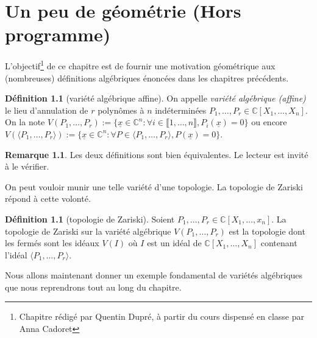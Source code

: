 \documentclass[a4paper, oneside, 12pt]{book}
\theoremstyle{theoremeStyle} %
\theoremstyle{definition} %
\newtheorem{definition}[theoreme]{Définition}
\newtheorem{remarque}[theoreme]{Remarque}
\newcommand{\CC}{\mathbb{C}}
\begin{document}
\chapter{Un peu de géométrie (Hors programme)}

L'objectif\footnote{Chapitre rédigé par Quentin Dupré, à partir du
  cours dispensé en classe par Anna Cadoret} de ce chapitre est de
fournir une motivation géométrique aux (nombreuses) définitions
algébriques énoncées dans les chapitres précédents.

\begin{definition}[variété algébrique affine]
  On appelle \textit{variété algébrique (affine)} le lieu d'annulation
  de $r$ polynômes à $n$ indéterminées
  $P_1,\dotsc,P_r\in\CC[X_1,\dotsc,X_n]$. On la note
  $V(P_1,\dotsc,P_r):=\{\underline{x}\in\CC^n:\forall i\in\llbracket
  1,\dotsc,n\rrbracket, P_i(\underline{x})=0\}$ ou encore $V(\langle
  P_1,\dotsc,P_r\rangle):=\{\underline{x}\in\CC^n:\forall P\in\langle
  P_1,\dotsc,P_r\rangle, P(\underline{x})=0\}$.
\end{definition}

\begin{remarque}
  Les deux définitions sont bien équivalentes. Le lecteur est invité à
  le vérifier.
\end{remarque}

On peut vouloir munir une telle variété d'une topologie. La topologie
de Zariski répond à cette volonté.

\begin{definition}[topologie de Zariski]
  Soient $P_1,\dotsc,P_r\in\CC[X_1,\dotsc,x_n]$. La topologie de
  Zariski sur la variété algébrique $V(P_1,\dotsc,P_r)$ est la
  topologie dont les fermés sont les idéaux $V(I)$ où $I$ est un idéal
  de $\CC[X_1,\dotsc,X_n]$ contenant l'idéal $\langle P_1,\dotsc,P_r\rangle$.
\end{definition}

Nous allons maintenant donner un exemple fondamental de variétés
algébriques que nous reprendrons tout au long du chapitre.
\end{document}
